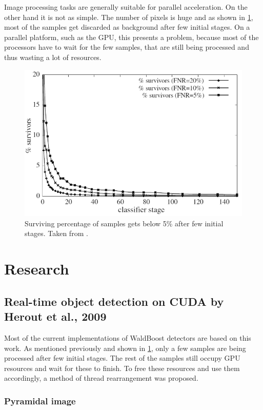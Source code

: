 Image processing tasks are generally suitable for parallel acceleration. On the other hand it is not as simple. The number of pixels is huge and as shown in \ref{fig:survivors}, most of the samples get discarded as background after few initial stages. On a parallel platform, such as the GPU, this presents a problem, because most of the processors have to wait for the few samples, that are still being processed and thus wasting a lot of resources.

\begin{center}
\begin{figure}[h]
	\centering\includegraphics[width=0.6\linewidth]{fig/survivors.png}
	\caption{Surviving percentage of samples gets below 5\% after few initial stages. Taken from \cite{herout-realtime-cuda}.}
	\label{fig:survivors}
\end{figure}
\end{center}

\section{Research}

\subsection{Real-time object detection on CUDA by Herout et al., 2009}

Most of the current implementations of WaldBoost detectors are based on this work. As mentioned previously and shown in \ref{fig:survivors}, only a few samples are being processed after few initial stages. The rest of the samples still occupy GPU resources and wait for these to finish. To free these resources and use them accordingly, a method of thread rearrangement was proposed.

\subsubsection{Pyramidal image}

